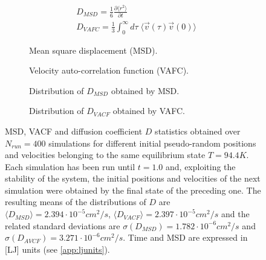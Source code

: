 \documentclass[12pt,english]{smfart}
\begin{document}
\begin{align}
& D_{MSD} = \frac{1}{6} \frac{\partial \langle r^2 \rangle}{\partial t} \label{eq:Dmsd} \\
& D_{VAFC} = \frac{1}{3} \int_0^\infty d\tau \; \langle \vec{v}(\tau) \vec{v}(0) \rangle \label{eq:Dvafc}
\end{align}

\begin{figure}
    \begin{subfigure}{0.5\textwidth}
        \resizebox{\textwidth}{!}{
            
        }
        \caption{Mean square displacement (MSD).}
        \label{msd_aver}
    \end{subfigure}
    \begin{subfigure}{0.5\textwidth}
        \resizebox{\textwidth}{!}{
            
        }
        \caption{Velocity auto-correlation function (VAFC).}
        \label{vacf_aver}
    \end{subfigure}
    
    \begin{subfigure}{0.5\textwidth}
        \resizebox{\textwidth}{!}{
            
        }
        \caption{Distribution of $D_{MSD}$ obtained by MSD.}
        \label{msd_distrib}
    \end{subfigure}
    \begin{subfigure}{0.5\textwidth}
        \resizebox{\textwidth}{!}{
            
        }
        \caption{Distribution of $D_{VACF}$ obtained by VAFC.}
        \label{vacf_distrib}
    \end{subfigure}
    \caption{MSD, VACF and diffusion coefficient $D$ statistics obtained over $N_{run} = 400$ simulations for different initial pseudo-random positions and velocities belonging to the same equilibrium state $T = 94.4 K$. Each simulation has been run until $t=1.0$ and, exploiting the stability of the system, the initial positions and velocities of the next simulation were obtained by the final state of the preceding one. The resulting means of the distributions of $D$ are $\langle D_{MSD} \rangle = 2.394 \cdot 10^{-5} \si{cm^2/s}$, $\langle D_{VACF} \rangle =  2.397 \cdot 10^{-5} \si{cm^2/s}$ and the related standard deviations are $\sigma(D_{MSD}) = 1.782 \cdot 10^{-6} \si{cm^2/s}$ and $\sigma(D_{AVCF}) = 3.271 \cdot 10^{-6} \si{cm^2/s}$.
    Time and MSD are expressed in [LJ] units (see \ref{app:ljunits}).}
\end{figure}
\end{document}
